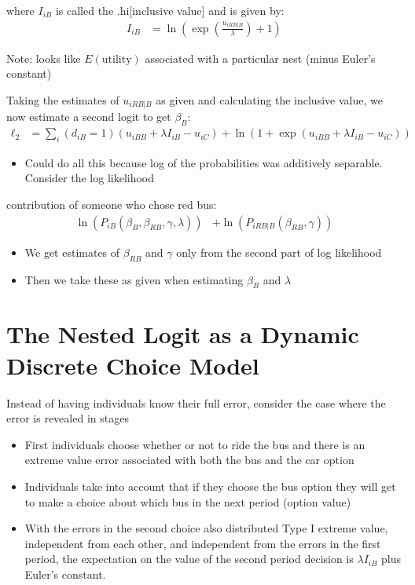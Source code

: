 \documentclass[11pt]{article}
\begin{document}
where \(I_{iB}\) is called the .hi[inclusive value] and is given by:
\begin{align*}
I_{iB}&=\ln\left(\exp\left(\frac{u_{iRB|B}}{\lambda}\right)+1\right)
\end{align*}

Note: looks like \(E\left(\text{utility}\right)\) associated with a particular nest (minus Euler's constant)


Taking the estimates of \(u_{iRB|B}\) as given and calculating the inclusive value, we now estimate a second logit to get \(\beta_B\):
\begin{align*}
\ell_2&=\sum_i(d_{iB}=1)(u_{iBB}+\lambda I_{iB}-u_{iC})+\ln(1+\exp(u_{iBB}+\lambda I_{iB}-u_{iC}))
\end{align*}

\begin{itemize}
\item Could do all this because log of the probabilities was additively separable. Consider the log likelihood
\end{itemize}
contribution of someone who chose red bus:
\begin{align*}
\ln(P_{iB}(\beta_{B},\beta_{RB},\gamma,\lambda))&+\ln(P_{iRB|B}(\beta_{RB},\gamma))
\end{align*}

\begin{itemize}
\item We get estimates of \(\beta_{RB}\) and \(\gamma\) only from the second part of log likelihood

\item Then we take these as given when estimating \(\beta_{B}\) and \(\lambda\)
\end{itemize}


\section{The Nested Logit as a Dynamic Discrete Choice Model}
\label{sec:orgd187265}

Instead of having individuals know their full error, consider the case where the error is revealed in stages

\begin{itemize}
\item First individuals choose whether or not to ride the bus and there is an extreme value error associated with both the bus and the car option
\item Individuals take into account that if they choose the bus option they will get to make a choice about which bus in the next period (option value)
\item With the errors in the second choice also distributed Type I extreme value, independent from each other, and independent from the errors in the first period, the expectation on the value of the second period decision is \(\lambda I_{iB}\) plus Euler's constant.
\end{itemize}
\end{document}
